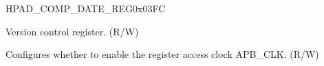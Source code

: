 \begin{register}{H}{PAD\_COMP\_DATE\_REG}{0x03FC}\label{regdesc:PADCOMPDATEREG}
%
%
%
\regnewline%
\begin{regdesc}\begin{reglist}
\label{fielddesc:PADCOMPDATE}\item [PAD\_COMP\_DATE] Version control register. (R/W)
\label{fielddesc:PADCOMPCLKEN}\item [PAD\_COMP\_CLK\_EN] Configures whether to enable the register access clock APB\_CLK. (R/W)
\end{reglist}\end{regdesc}
\end{register}
    